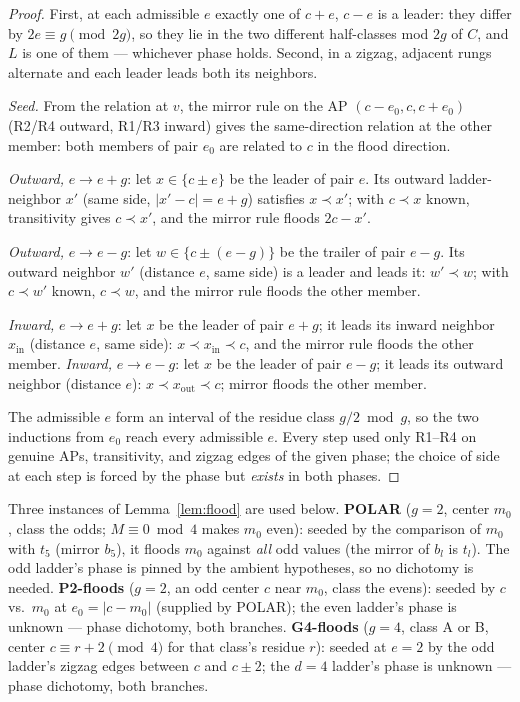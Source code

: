 \documentclass[11pt]{article}
\theoremstyle{definition}
\begin{document}
\begin{proof}
First, at each admissible $e$ exactly one of $c + e$, $c - e$ is a
leader: they differ by $2e \equiv g \pmod{2g}$, so they lie in the two
different half-classes mod $2g$ of $C$, and $L$ is one of them ---
whichever phase holds. Second, in a zigzag, adjacent rungs alternate
and each leader leads both its neighbors.

\emph{Seed.} From the relation at $v$, the mirror rule on the AP
$(c - e_0, c, c + e_0)$ (R2/R4 outward, R1/R3 inward) gives the
same-direction relation at the other member: both members of pair
$e_0$ are related to $c$ in the flood direction.

\emph{Outward, } $e \to e + g$: let $x \in \{c \pm e\}$ be the leader
of pair $e$. Its outward ladder-neighbor $x'$ (same side,
$|x' - c| = e + g$) satisfies $x \prec x'$; with $c \prec x$ known,
transitivity gives $c \prec x'$, and the mirror rule floods
$2c - x'$.

\emph{Outward, } $e \to e - g$: let $w \in \{c \pm (e - g)\}$ be the
trailer of pair $e - g$. Its outward neighbor $w'$ (distance $e$, same
side) is a leader and leads it: $w' \prec w$; with $c \prec w'$ known,
$c \prec w$, and the mirror rule floods the other member.

\emph{Inward, } $e \to e + g$: let $x$ be the leader of pair $e + g$;
it leads its inward neighbor $x_{\mathrm{in}}$ (distance $e$, same
side): $x \prec x_{\mathrm{in}} \prec c$, and the mirror rule floods
the other member. \emph{Inward, } $e \to e - g$: let $x$ be the leader
of pair $e - g$; it leads its outward neighbor (distance $e$):
$x \prec x_{\mathrm{out}} \prec c$; mirror floods the other member.

The admissible $e$ form an interval of the residue class $g/2 \bmod g$,
so the two inductions from $e_0$ reach every admissible $e$. Every step
used only R1--R4 on genuine APs, transitivity, and zigzag edges of the
given phase; the choice of side at each step is forced by the phase but
\emph{exists} in both phases.
\end{proof}

Three instances of Lemma~\ref{lem:flood} are used below.
\textbf{POLAR} ($g = 2$, center $m_0$,
class the odds; $M \equiv 0 \bmod 4$ makes $m_0$ even): seeded by the
comparison of $m_0$ with $t_5$ (mirror $b_5$), it floods $m_0$ against
\emph{all} odd values (the mirror of $b_l$ is $t_l$). The odd ladder's
phase is pinned by the ambient hypotheses, so no dichotomy is needed.
\textbf{P2-floods} ($g = 2$, an odd center $c$ near $m_0$, class the
evens): seeded by $c$ vs.\ $m_0$ at $e_0 = |c - m_0|$ (supplied by
POLAR); the even ladder's phase is unknown --- phase dichotomy, both
branches. \textbf{G4-floods} ($g = 4$, class A or B, center $c \equiv r +
2 \pmod 4$ for that class's residue $r$): seeded at $e = 2$ by the odd ladder's zigzag
edges between $c$ and $c \pm 2$; the $d = 4$ ladder's phase is unknown
--- phase dichotomy, both branches.
\end{document}
